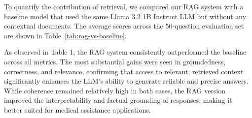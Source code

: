To quantify the contribution of retrieval, we compared our RAG system with a baseline model that used the same Llama 3.2 1B Instruct LLM but without any contextual documents. The average scores across the 50-question evaluation set are shown in Table~\ref{tab:rag-vs-baseline}.

As observed in Table 1, the RAG system consistently outperformed the baseline across all metrics. The most substantial gains were seen in groundedness, correctness, and relevance, confirming that access to relevant, retrieved context significantly enhances the LLM’s ability to generate reliable and precise answers. While coherence remained relatively high in both cases, the RAG version improved the interpretability and factual grounding of responses, making it better suited for medical assistance applications.